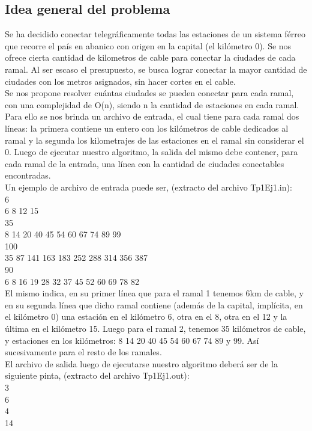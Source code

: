 \subsection{Idea general del problema}
Se ha decidido conectar telegráficamente todas las estaciones de un sistema férreo que recorre el país en abanico con origen en la capital (el kilómetro 0). Se nos ofrece cierta cantidad de kilometros de cable para conectar la ciudades de cada ramal. Al ser escaso el presupuesto, se busca lograr conectar la mayor cantidad de ciudades con los metros asignados, sin hacer cortes en el cable. \\

Se nos propone resolver cuántas ciudades se pueden conectar para cada ramal, con una complejidad de O(n), siendo n la cantidad de estaciones en cada ramal.\\

Para ello se nos brinda un archivo de entrada, el cual tiene para cada ramal dos líneas: la primera contiene un entero con los kilómetros de cable dedicados al ramal y la segunda los kilometrajes de las estaciones en el ramal sin considerar el 0. Luego de ejecutar nuestro algoritmo, la salida del mismo debe contener, para cada ramal de la entrada, una línea con la cantidad de ciudades conectables encontradas.\\

Un ejemplo de archivo de entrada puede ser, (extracto del archivo Tp1Ej1.in):\\
6 \\
6 8 12 15 \\
35 \\
8 14 20 40 45 54 60 67 74 89 99 \\
100 \\
35 87 141 163 183 252 288 314 356 387 \\
90 \\
6 8 16 19 28 32 37 45 52 60 69 78 82 \\

El mismo indica, en su primer línea que para el ramal 1 tenemos 6km de cable, y en su segunda línea que dicho ramal contiene (además de la capital, implícita, en el kilómetro 0) una estación en el kilómetro 6, otra en el 8, otra en el 12 y la última en el kilómetro 15. Luego para el ramal 2, tenemos 35 kilómetros de cable, y estaciones en los kilómetros: 8 14 20 40 45 54 60 67 74 89 y 99. Así sucesivamente para el resto de los ramales.\\

El archivo de salida luego de ejecutarse nuestro algoritmo deberá ser de la siguiente pinta, (extracto del archivo Tp1Ej1.out):\\
3 \\
6 \\
4 \\
14 \\

